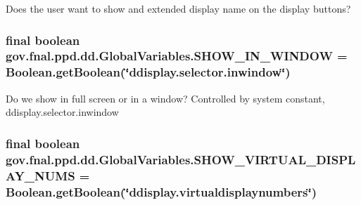 Does the user want to show and extended display name on the display buttons? \hypertarget{classgov_1_1fnal_1_1ppd_1_1dd_1_1GlobalVariables_af0e7b37c8bf6495b999b93ed0f4f1c76}{
\subsubsection[{S\-H\-O\-W\-\_\-\-I\-N\-\_\-\-W\-I\-N\-D\-O\-W}]{\setlength{\rightskip}{0pt plus 5cm}final boolean gov.\-fnal.\-ppd.\-dd.\-Global\-Variables.\-S\-H\-O\-W\-\_\-\-I\-N\-\_\-\-W\-I\-N\-D\-O\-W = Boolean.\-get\-Boolean(\char`\"{}ddisplay.\-selector.\-inwindow\char`\"{})\hspace{0.3cm}{\ttfamily [static]}}}\label{classgov_1_1fnal_1_1ppd_1_1dd_1_1GlobalVariables_af0e7b37c8bf6495b999b93ed0f4f1c76}
Do we show in full screen or in a window? Controlled by system constant, ddisplay.\-selector.\-inwindow \hypertarget{classgov_1_1fnal_1_1ppd_1_1dd_1_1GlobalVariables_a7ccfa5abda77efe03cd888f14d4171a3}{
\subsubsection[{S\-H\-O\-W\-\_\-\-V\-I\-R\-T\-U\-A\-L\-\_\-\-D\-I\-S\-P\-L\-A\-Y\-\_\-\-N\-U\-M\-S}]{\setlength{\rightskip}{0pt plus 5cm}final boolean gov.\-fnal.\-ppd.\-dd.\-Global\-Variables.\-S\-H\-O\-W\-\_\-\-V\-I\-R\-T\-U\-A\-L\-\_\-\-D\-I\-S\-P\-L\-A\-Y\-\_\-\-N\-U\-M\-S = Boolean.\-get\-Boolean(\char`\"{}ddisplay.\-virtualdisplaynumbers\char`\"{})\hspace{0.3cm}{\ttfamily [static]}}}\label{classgov_1_1fnal_1_1ppd_1_1dd_1_1GlobalVariables_a7ccfa5abda77efe03cd888f14d4171a3}
